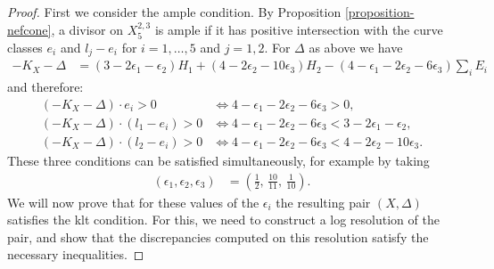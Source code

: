 \documentclass[a4paper,11pt]{article}
\newcommand{\blowup}[3]{X^{#1,#2}_{#3}}
\begin{document}
\begin{proof}
  First we consider the ample condition. By Proposition \ref{proposition-nefcone}, a divisor on $\blowup{2}{3}{5}$ is ample if it has positive intersection with the curve classes $e_i$ and $l_j-e_i$ for $i=1,\ldots,5$ and $j=1,2$. For $\Delta$ as above we have
    \begin{align*}
      -K_X - \Delta &= (3-2\epsilon_1 -\epsilon_2)H_1+(4-2\epsilon_2-10\epsilon_3)H_2 - \left( 4-\epsilon_1-2\epsilon_2-6\epsilon_3 \right) \sum_i E_i
    \end{align*}
    and therefore:
\begin{align*}
   (-K_X-\Delta)\cdot e_i>0 &\iff
 4-\epsilon_1-2\epsilon_2-6\epsilon_3>0,\\
 (-K_X-\Delta)\cdot (l_1-e_i)>0 &\iff
 4-\epsilon_1-2\epsilon_2-6\epsilon_3<3-2\epsilon_1-\epsilon_2,\\
 (-K_X-\Delta)\cdot (l_2-e_i)>0 &\iff
 4-\epsilon_1-2\epsilon_2-6\epsilon_3 <4-2\epsilon_2-10\epsilon_3.
\end{align*}   
These three conditions can be satisfied simultaneously, for example by taking
\begin{align*}
\left(\epsilon_1,\epsilon_2,\epsilon_3 \right) &=\left( \frac12, \, \frac{10}{11}, \, \frac{1}{10} \right).
\end{align*}
We will now prove that for these values of the $\epsilon_i$ the resulting pair $(X,\Delta)$ satisfies the klt condition. For this, we need to construct a log resolution of the pair, and show that the discrepancies computed on this resolution satisfy the necessary inequalities. 


\end{proof}
\end{document}
